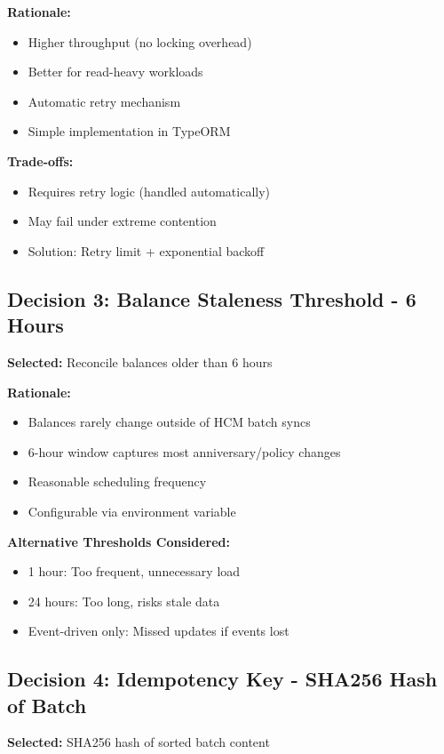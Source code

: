 \documentclass[12pt,a4paper]{article}
\begin{document}
\textbf{Rationale:}
\begin{itemize}
    \item Higher throughput (no locking overhead)
    \item Better for read-heavy workloads
    \item Automatic retry mechanism
    \item Simple implementation in TypeORM
\end{itemize}

\textbf{Trade-offs:}
\begin{itemize}
    \item Requires retry logic (handled automatically)
    \item May fail under extreme contention
    \item Solution: Retry limit + exponential backoff
\end{itemize}

\subsection{Decision 3: Balance Staleness Threshold - 6 Hours}

\textbf{Selected:} Reconcile balances older than 6 hours

\textbf{Rationale:}
\begin{itemize}
    \item Balances rarely change outside of HCM batch syncs
    \item 6-hour window captures most anniversary/policy changes
    \item Reasonable scheduling frequency
    \item Configurable via environment variable
\end{itemize}

\textbf{Alternative Thresholds Considered:}
\begin{itemize}
    \item 1 hour: Too frequent, unnecessary load
    \item 24 hours: Too long, risks stale data
    \item Event-driven only: Missed updates if events lost
\end{itemize}

\subsection{Decision 4: Idempotency Key - SHA256 Hash of Batch}

\textbf{Selected:} SHA256 hash of sorted batch content
\end{document}
